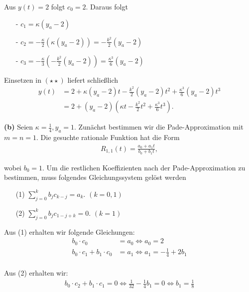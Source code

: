 \documentclass[a4paper]{article}
\begin{document}
  Aus $y(t) = 2$ folgt $c_0 = 2$. Daraus folgt
  \begin{itemize}
    \item[-] $c_1 = \kappa(y_a - 2)$
    \item[-] $c_2 = -\frac{\kappa}{2} (\kappa (y_a - 2)) = -\frac{k^2}{2}(y_a - 2)$ 
    \item[-] $c_3 = -\frac{\kappa}{3}(-\frac{k^2}{2}(y_a - 2)) = \frac{\kappa^3}{6}(y_a - 2)$
  \end{itemize}

  Einsetzen in $(\star\star)$ liefert schließlich 
  \begin{align*}
    y(t) &= 2 + \kappa(y_a - 2)t - \frac{k^2}{2}(y_a - 2)t^2 + \frac{\kappa^3}{6}(y_a - 2)t^3 \\
         &= 2 + (y_a - 2) \left( \kappa t - \frac{k^2}{2} t^2 + \frac{\kappa^3}{6} t^3 \right). \qquad 
  \end{align*}
  
  \newpage 

  \textbf{(b)} Seien $\kappa = \frac{1}{4}, y_a = 1$. Zunächst bestimmen wir die Pade-Approximation mit $m=n=1$. 
    Die gesuchte rationale Funktion hat die Form 
    \begin{align*}
      R_{1,1}(t) = \frac{a_0 + a_1t}{b_0 + b_1t},
    \end{align*}

    wobei $b_0 = 1$.
    Um die restlichen Koeffizienten nach der Pade-Approximation zu bestimmen, muss folgendes Gleichungssystem gelöst werden
    \begin{enumerate}
      \item[(1)] $\sum_{j=0}^{k} b_j c_{k-j} = a_k$. \quad $(k = 0,1)$
      \item[(2)] $\sum_{j=0}^{k} b_j c_{1-j+k} = 0$. \quad $(k = 1)$ 
    \end{enumerate}

    Aus (1) erhalten wir folgende Gleichungen: 
    \begin{align*}
      b_0\cdot c_0 &= a_0 \iff a_0 = 2    \\
      b_0\cdot c_1 + b_1\cdot c_0 &= a_1 \iff a_1 = -\frac{1}{4} + 2b_1   \\
    \end{align*}

    Aus (2) erhalten wir: 
    \begin{align*}
      b_0\cdot c_2 + b_1\cdot c_1 = 0 \iff \frac{1}{32} - \frac{1}{4}b_1 = 0 \iff b_1 = \frac{1}{8}
    \end{align*}
\end{document}
